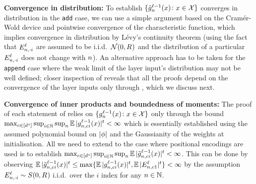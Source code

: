 \textbf{Convergence in distribution:}
To establish $\{ {\tilde{g}}^{\ell - 1}_{n}{(x)} \colon x \in \mathcal{X} \}$ converges in distribution in the \texttt{add} case, we can use a simple argument based on the Cram{\' e}r-Wold device and pointwise convergence of the characteristic function, which implies convergence in distribution by L{\' e}vy's continuity theorem (using the fact that $E_{n, \cdot i}^{\ell}$ are assumed to be i.i.d.\ $\mathcal{N}(0, R_{}^{})$ and the distribution of a particular $E_{n, \cdot i}^{\ell}$ does not change with $n$).
An alternative approach has to be taken for the \texttt{append} case where the weak limit of the layer input's distribution may not be well defined; closer inspection of  reveals that all the proofs depend on the convergence of the layer inputs only through , which we discuss next.



\textbf{Convergence of inner products and boundedness of moments:}
The proof of each statement of  relies on $\{ {g}^{\ell - 1}_{n}{(x)} \colon x \in \mathcal{X} \}$ only through the bound  
$
    \max_{c \in [d^s]}
    \sup_{\substack{i \in \mathbb{N}}}
    \sup_{n}
        \operatorname*{\mathbb{E}} | 
            {g}^{\ell - 1}_{n, c i}{(x)} 
        |^t
    <
    \infty
$
which is essentially established using the assumed polynomial bound on $| \phi |$ and the Gaussianity of the weights at initialisation.
All we need to extend  to the case where positional encodings are used is to establish 
$
    \max_{c \in [d^s]}
    \sup_{\substack{i \in \mathbb{N}}}
    \sup_{n}
        \operatorname*{\mathbb{E}} | 
            {\tilde{g}}^{\ell - 1}_{n, c i}{(x)} 
        |^t
    <
    \infty
$.
This can be done by observing 
$
    \operatorname*{\mathbb{E}} | 
        {\tilde{g}}^{\ell - 1}_{n, c i}{(x)} 
    |^t
    \leq
    \max \{
        \operatorname*{\mathbb{E}} | 
            {g}^{\ell - 1}_{n, c i}{(x)}
        |^t
        ,
        \operatorname*{\mathbb{E}} |
            E_{n, c 1}^{\ell}
        |^t
    \}
    <
    \infty
$
by the assumption $E_{n, \cdot i}^{\ell} \sim S(0, R_{}^{})$ i.i.d.\ over the $i$ index for any $n \in \mathbb{N}$.

